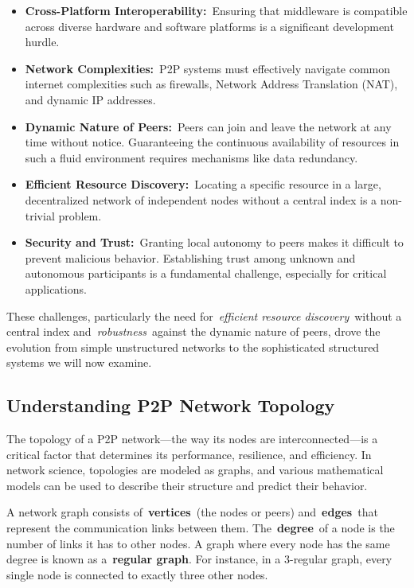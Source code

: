 \documentclass{scrbook}
\begin{document}
\begin{itemize}
\item
  \textbf{Cross-Platform Interoperability:}~Ensuring that middleware is
  compatible across diverse hardware and software platforms is a
  significant development hurdle.
\item
  \textbf{Network Complexities:}~P2P systems must effectively navigate
  common internet complexities such as firewalls, Network Address
  Translation (NAT), and dynamic IP addresses.
\item
  \textbf{Dynamic Nature of Peers:}~Peers can join and leave the network
  at any time without notice. Guaranteeing the continuous availability
  of resources in such a fluid environment requires mechanisms like data
  redundancy.
\item
  \textbf{Efficient Resource Discovery:}~Locating a specific resource in
  a large, decentralized network of independent nodes without a central
  index is a non-trivial problem.
\item
  \textbf{Security and Trust:}~Granting local autonomy to peers makes it
  difficult to prevent malicious behavior. Establishing trust among
  unknown and autonomous participants is a fundamental challenge,
  especially for critical applications.
\end{itemize}

These challenges, particularly the need for~\emph{efficient resource
discovery}~without a central index and~\emph{robustness}~against the
dynamic nature of peers, drove the evolution from simple unstructured
networks to the sophisticated structured systems we will now examine.

\subsection{Understanding P2P Network
Topology}\label{understanding-p2p-network-topology}

The topology of a P2P network---the way its nodes are
interconnected---is a critical factor that determines its performance,
resilience, and efficiency. In network science, topologies are modeled
as graphs, and various mathematical models can be used to describe their
structure and predict their behavior.

A network graph consists of~\textbf{vertices}~(the nodes or peers)
and~\textbf{edges}~that represent the communication links between them.
The~\textbf{degree}~of a node is the number of links it has to other
nodes. A graph where every node has the same degree is known as
a~\textbf{regular graph}. For instance, in a 3-regular graph, every
single node is connected to exactly three other nodes.
\end{document}
